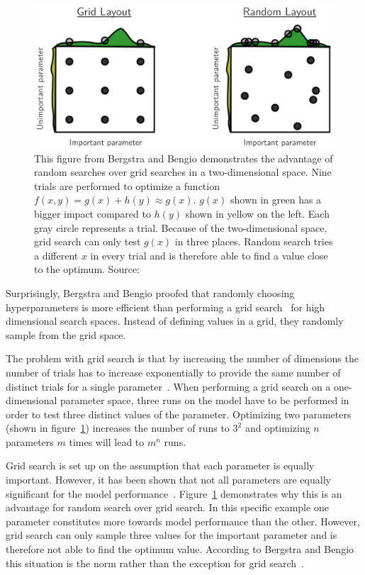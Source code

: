 \begin{figure}[ht]
	\centering
	\includegraphics[scale=0.35]{figures/03_theory/03_randomSearch}
	\caption{This figure from Bergstra and Bengio demonstrates the advantage of random searches over grid searches in a two-dimensional space. Nine trials are performed to optimize a function $f(x, y) = g(x) + h(y) \approx g(x)$. $g(x)$ shown in green has a bigger impact compared to $h(y)$ shown in yellow on the left. Each gray circle represents a trial. Because of the two-dimensional space, grid search can only test $g(x)$ in three places. Random search tries a different $x$ in every trial and is therefore able to find a value close to the optimum. Source:~\cite{Bergstra2012a}}
	\label{fig:03_randomSearch}
\end{figure}

Surprisingly, Bergstra and Bengio proofed that randomly choosing hyperparameters is more efficient than performing a grid search~\cite{Bergstra2012a} for high dimensional search spaces. Instead of defining values in a grid, they randomly sample from the grid space.

The problem with grid search is that by increasing the number of dimensions the number of trials has to increase exponentially to provide the same number of distinct trials for a single parameter~\cite{Bergstra2012a}. When performing a grid search on a one-dimensional parameter space, three runs on the model have to be performed in order to test three distinct values of the parameter. Optimizing two parameters {(shown in figure~\ref{fig:03_randomSearch})} increases the number of runs to $3^2$ and optimizing $n$ parameters $m$ times will lead to $m^n$ runs. 

Grid search is set up on the assumption that each parameter is equally important. However, it has been shown that not all parameters are equally significant for the model performance~\cite{Bergstra2012a}. Figure~\ref{fig:03_randomSearch} demonstrates why this is an advantage for random search over grid search. In this specific example one parameter constitutes more towards model performance than the other. However, grid search can only sample three values for the important parameter and is therefore not able to find the optimum value. According to Bergstra and Bengio this situation is the norm rather than the exception for grid search~\cite{Bergstra2012a}.

